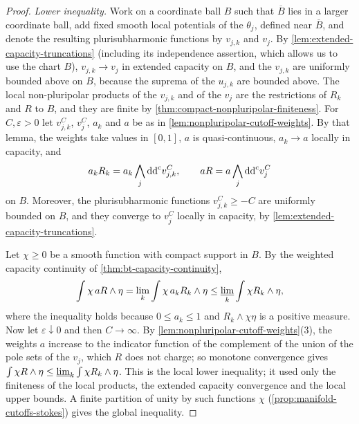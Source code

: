 \begin{proof}
\emph{Lower inequality.} Work on a coordinate ball $B$ such that $\overline B$ lies in a larger coordinate ball, add fixed smooth local potentials of the $\theta_j$, defined near $\overline B$, and denote the resulting plurisubharmonic functions by $v_{j,k}$ and $v_j$. By \cref{lem:extended-capacity-truncations} (including its independence assertion, which allows us to use the chart $B$), $v_{j,k}\to v_j$ in extended capacity on $B$, and the $v_{j,k}$ are uniformly bounded above on $B$, because the suprema of the $u_{j,k}$ are bounded above. The local non-pluripolar products of the $v_{j,k}$ and of the $v_j$ are the restrictions of $R_k$ and $R$ to $B$, and they are finite by \cref{thm:compact-nonpluripolar-finiteness}. For $C,\varepsilon>0$ let $v_{j,k}^C$, $v_j^C$, $a_k$ and $a$ be as in \cref{lem:nonpluripolar-cutoff-weights}. By that lemma, the weights take values in $[0,1]$, $a$ is quasi-continuous, $a_k\to a$ locally in capacity, and
\[
 a_k R_k=a_k\bigwedge_j\mathrm{dd}^{\mathrm{c}} v_{j,k}^C,\qquad aR=a\bigwedge_j\mathrm{dd}^{\mathrm{c}} v_j^C
\]
on $B$. Moreover, the plurisubharmonic functions $v_{j,k}^C\geq-C$ are uniformly bounded on $B$, and they converge to $v_j^C$ locally in capacity, by \cref{lem:extended-capacity-truncations}.

Let $\chi\geq0$ be a smooth function with compact support in $B$. By the weighted capacity continuity of \cref{thm:bt-capacity-continuity},
\[
 \int\chi\,aR\wedge\eta=\lim_k\int\chi\,a_kR_k\wedge\eta\leq\varliminf_k\int\chi R_k\wedge\eta,
\]
where the inequality holds because $0\leq a_k\leq1$ and $R_k\wedge\chi\eta$ is a positive measure. Now let $\varepsilon\downarrow0$ and then $C\to\infty$. By \cref{lem:nonpluripolar-cutoff-weights}(3), the weights $a$ increase to the indicator function of the complement of the union of the pole sets of the $v_j$, which $R$ does not charge; so monotone convergence gives $\int\chi R\wedge\eta\leq\varliminf_k\int\chi R_k\wedge\eta$. This is the local lower inequality; it used only the finiteness of the local products, the extended capacity convergence and the local upper bounds. A finite partition of unity by such functions $\chi$ (\cref{prop:manifold-cutoffs-stokes}) gives the global inequality.


\end{proof}
